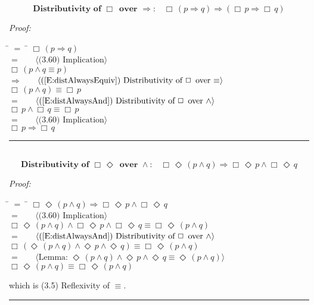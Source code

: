\documentclass[fleqn, leqno]{article}
\newcommand{\lgap}{2pt}                             %
\newcommand{\mymathindent}{24pt}                    %
\newcommand{\Event}{\Diamond\,}
\newcommand{\Always}{\Box\,}
\newcommand{\myqed}{\hfill\rule[-.23ex]{1.2ex}{2.0ex}}
\newcommand{\Gll} {\langle}                         %
\newcommand{\Ggg} {\rangle}                         %
\newcommand{\Hint}[1]     {\ \ \ $\Gll              \mbox{#1} \Ggg$ }   %
\begin{document}
\begin{equation}\label{E:distAlwaysImp}
\textbf{Distributivity of $\Always$ over $\Rightarrow$:}\quad \Always (p \Rightarrow q) \Rightarrow (\Always p \Rightarrow \Always q)
\end{equation}

\emph{Proof:}
\begin{tabbing}
\hspace{\mymathindent} \= $= \;$ \= \kill
  \> \>   $\Always (p \Rightarrow q)$\\[\lgap]
  \> $=$  \>  \Hint{(3.60) Implication}\\[\lgap]
  \> \>   $\Always (p \land q \equiv p)$\\[\lgap]
  \> $\Rightarrow$  \>  \Hint{(\ref{E:distAlwaysEquiv}) Distributivity of $\Always$ over $\equiv$}\\[\lgap]
  \> \>   $\Always(p \land q) \equiv \Always p$\\[\lgap]
  \> $=$  \>  \Hint{(\ref{E:distAlwaysAnd}) Distributivity of $\Always$ over $\land$}\\[\lgap]
  \> \>   $\Always p \land \Always q \equiv \Always p$\\[\lgap]
  \> $=$  \>  \Hint{(3.60) Implication}\\[\lgap]
  \> \>   $\Always p \Rightarrow \Always q$\\[\lgap]
\end{tabbing}
\myqed\\[\lgap]


\begin{equation}\label{E:distAlwaysEventAnd}
\textbf{Distributivity of $\Always\Event$ over $\land$:}\quad \Always\Event(p \land q) \Rightarrow \Always\Event p \land \Always\Event q
\end{equation}

\emph{Proof:}
\begin{tabbing}
\hspace{\mymathindent} \= $= \;$ \= \kill
  \> \>   $\Always\Event(p \land q) \Rightarrow \Always\Event p \land \Always\Event q$\\[\lgap]
  \> $=$  \>  \Hint{(3.60) Implication}\\[\lgap]
  \> \>   $\Always\Event(p \land q) \land \Always\Event p \land \Always\Event q \equiv \Always\Event(p \land q)$\\[\lgap]
  \> $=$  \>  \Hint{(\ref{E:distAlwaysAnd}) Distributivity of $\Always$ over $\land$}\\[\lgap]
  \> \>   $\Always(\Event(p \land q) \land \Event p \land \Event q) \equiv \Always\Event(p \land q)$\\[\lgap]
  \> $=$  \>  \Hint{Lemma: $\Event(p \land q) \land \Event p \land \Event q \equiv \Event(p \land q)$}\\[\lgap]
  \> \>   $\Always\Event(p \land q) \equiv \Always\Event(p \land q)$\\[\lgap]
\end{tabbing}
which is (3.5) Reflexivity of $\equiv$. \myqed\\[\lgap]
\end{document}

